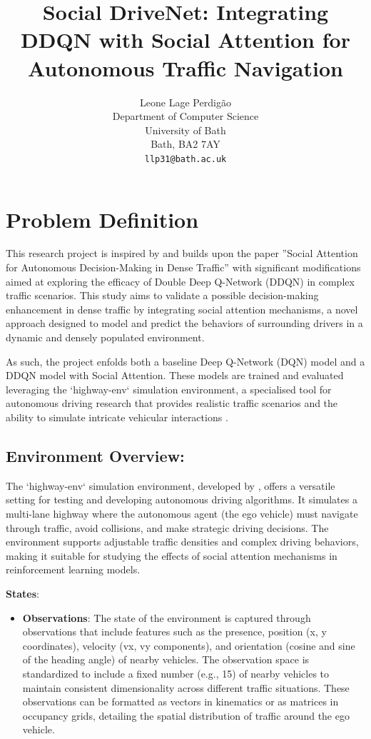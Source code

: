 \documentclass{article}
\title{Social DriveNet: Integrating DDQN with Social Attention for Autonomous Traffic Navigation}
\author{
  Leone Lage Perdigão
  \\
  Department of Computer Science\\
  University of Bath\\
  Bath, BA2 7AY \\
  \texttt{llp31@bath.ac.uk} \\
}
\begin{document}
\maketitle

\section{Problem Definition}

This research project is inspired by and builds upon the paper ''Social Attention for Autonomous Decision-Making in Dense Traffic'' \citep{leurent2019social} with significant modifications aimed at exploring the efficacy of Double Deep Q-Network (DDQN) in complex traffic scenarios. This study aims to validate a possible decision-making enhancement in dense traffic by integrating social attention mechanisms, a novel approach designed to model and predict the behaviors of surrounding drivers in a dynamic and densely populated environment.

As such, the project enfolds both a baseline Deep Q-Network (DQN) model and a DDQN model with Social Attention. These models are trained and evaluated leveraging the `highway-env` simulation environment, a specialised tool for autonomous driving research that provides realistic traffic scenarios and the ability to simulate intricate vehicular interactions \citep{highway-env}.

\subsection{Environment Overview:}
The `highway-env` simulation environment, developed by \citet{highway-env}, offers a versatile setting for testing and developing autonomous driving algorithms. It simulates a multi-lane highway where the autonomous agent (the ego vehicle) must navigate through traffic, avoid collisions, and make strategic driving decisions. The environment supports adjustable traffic densities and complex driving behaviors, making it suitable for studying the effects of social attention mechanisms in reinforcement learning models.

\textbf{States}:
\begin{itemize}
  \item \textbf{Observations}: The state of the environment is captured through observations that include features such as the presence, position (x, y coordinates), velocity (vx, vy components), and orientation (cosine and sine of the heading angle) of nearby vehicles. The observation space is standardized to include a fixed number (e.g., 15) of nearby vehicles to maintain consistent dimensionality across different traffic situations. These observations can be formatted as vectors in kinematics or as matrices in occupancy grids, detailing the spatial distribution of traffic around the ego vehicle.
\end{itemize}
\end{document}
